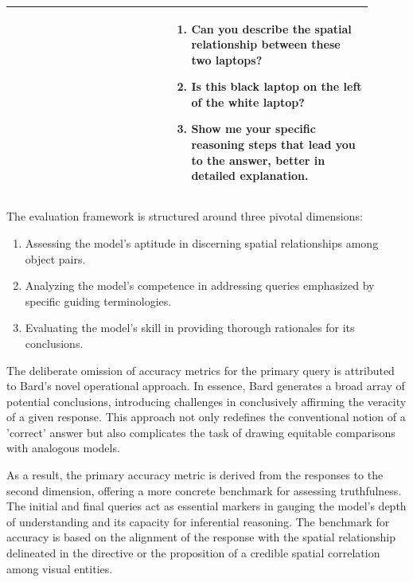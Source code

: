 \documentclass[journal,10pt]{IEEEtran}
\begin{document}
\begin{table}[ht]
\begin{tabular}{|p{0.4\linewidth}|p{0.5\linewidth}|}
        & \begin{enumerate}
            \item Can you describe the spatial relationship between these two laptops?
            \item Is this black laptop on the left of the white laptop?
            \item Show me your specific reasoning steps that lead you to the answer, better in detailed explanation.
        \end{enumerate}\\
        \hline
        \end{tabular}
\end{table}

The evaluation framework is structured around three pivotal dimensions:
\begin{enumerate}
\item Assessing the model's aptitude in discerning spatial relationships among object pairs.
\item Analyzing the model's competence in addressing queries emphasized by specific guiding terminologies.
\item Evaluating the model's skill in providing thorough rationales for its conclusions.
\end{enumerate}
The deliberate omission of accuracy metrics for the primary query is attributed to Bard's novel operational approach. In essence, Bard generates a broad array of potential conclusions, introducing challenges in conclusively affirming the veracity of a given response. This approach not only redefines the conventional notion of a 'correct' answer but also complicates the task of drawing equitable comparisons with analogous models.

As a result, the primary accuracy metric is derived from the responses to the second dimension, offering a more concrete benchmark for assessing truthfulness. The initial and final queries act as essential markers in gauging the model's depth of understanding and its capacity for inferential reasoning. The benchmark for accuracy is based on the alignment of the response with the spatial relationship delineated in the directive or the proposition of a credible spatial correlation among visual entities.
\end{document}
